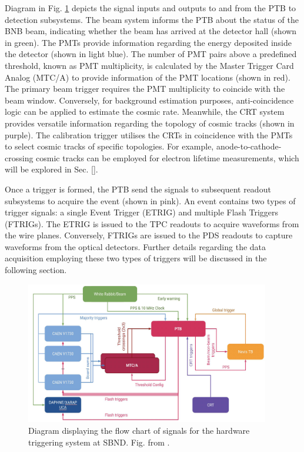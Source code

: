 Diagram in Fig. \ref{fig:SBND_Trigger} depicts the signal inputs and outputs to and from the PTB to detection subsystems.
The beam system informs the PTB about the status of the BNB beam, indicating whether the beam has arrived at the detector hall (shown in green).
The PMTs provide information regarding the energy deposited inside the detector (shown in light blue).
The number of PMT pairs above a predefined threshold, known as PMT multiplicity, is calculated by the Master Trigger Card Analog (MTC/A) to provide information of the PMT locations (shown in red).
The primary beam trigger requires the PMT multiplicity to coincide with the beam window. 
Conversely, for background estimation purposes, anti-coincidence logic can be applied to estimate the cosmic rate.
Meanwhile, the CRT system provides versatile information regarding the topology of cosmic tracks (shown in purple). 
The calibration trigger utilises the CRTs in coincidence with the PMTs to select cosmic tracks of specific topologies. 
For example, anode-to-cathode-crossing cosmic tracks can be employed for electron lifetime measurements, which will be explored in Sec. \ref{}.

Once a trigger is formed, the PTB send the signals to subsequent readout subsystems to acquire the event (shown in pink).
An event contains two types of trigger signals: a single Event Trigger (ETRIG) and multiple Flash Triggers (FTRIGs).
The ETRIG is issued to the TPC readouts to acquire waveforms from the wire planes. 
Conversely, FTRIGs are issued to the PDS readouts to capture waveforms from the optical detectors. 
Further details regarding the data acquisition employing these two types of triggers will be discussed in the following section.

\begin{figure}[htbp] 
\centering    
\includegraphics[width=0.95\textwidth]{SBND_Trigger}
\caption[SBND_PDS]{
Diagram displaying the flow chart of signals for the hardware triggering system at SBND.
Fig. from \cite{}.
}
\label{fig:SBND_Trigger}
\end{figure}
